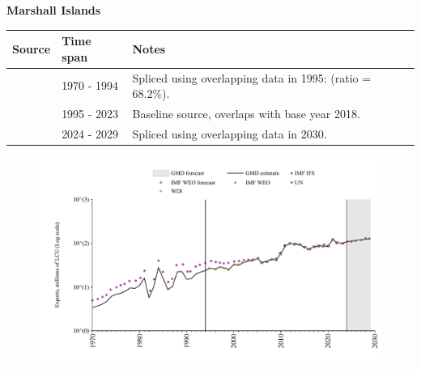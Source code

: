 \documentclass[12pt,a4paper,landscape]{article}
\begin{document}
\begin{adjustbox}{max totalsize={\paperwidth}{\paperheight},center}
\begin{minipage}[t][\textheight][t]{\textwidth}
\vspace*{0.5cm}
{}
\begin{center}
{\Large\bfseries Marshall Islands}
\end{center}
\vspace{0.5cm}
\begin{table}[H]
\centering
\small
\begin{tabular}{|l|l|l|}
\hline
\textbf{Source} & \textbf{Time span} & \textbf{Notes} \\
\hline
\rowcolor{white}\cite{UN}& 1970 - 1994 &Spliced using overlapping data in 1995: (ratio = 68.2\%).\\
\rowcolor{lightgray}\cite{WDI}& 1995 - 2023 &Baseline source, overlaps with base year 2018.\\
\rowcolor{white}\cite{IMF_WEO_forecast}& 2024 - 2029 &Spliced using overlapping data in 2030.\\
\hline
\end{tabular}
\end{table}
\begin{figure}[H]
\centering
\includegraphics[width=\textwidth,height=0.6\textheight,keepaspectratio]{graphs/MHL_exports.pdf}
\end{figure}
\end{minipage}
\end{adjustbox}
\end{document}
